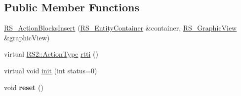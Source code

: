 \subsection*{Public Member Functions}
\begin{DoxyCompactItemize}
\item 
\hyperlink{classRS__ActionBlocksInsert_a788d1de9d41c1f6e33b92ae182101644}{R\-S\-\_\-\-Action\-Blocks\-Insert} (\hyperlink{classRS__EntityContainer}{R\-S\-\_\-\-Entity\-Container} \&container, \hyperlink{classRS__GraphicView}{R\-S\-\_\-\-Graphic\-View} \&graphic\-View)
\item 
virtual \hyperlink{classRS2_afe3523e0bc41fd637b892321cfc4b9d7}{R\-S2\-::\-Action\-Type} \hyperlink{classRS__ActionBlocksInsert_a28572d8f5f8a2048e774e7ff73232183}{rtti} ()
\item 
virtual void \hyperlink{classRS__ActionBlocksInsert_afbf7e8fbc47cafd8e2b53d08ad9fca8d}{init} (int status=0)
\item 
\hypertarget{classRS__ActionBlocksInsert_aaf2238465a1c1ec038831ff8ac717d73}{void {\bfseries reset} ()}\label{classRS__ActionBlocksInsert_aaf2238465a1c1ec038831ff8ac717d73}


\end{DoxyCompactItemize}
